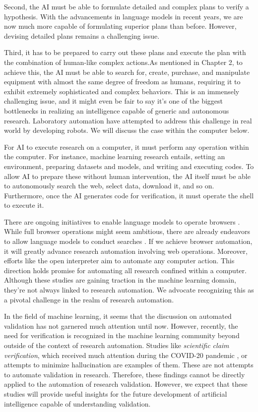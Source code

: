 Second, the AI must be able to formulate detailed and complex plans to verify a hypothesis. With the advancements in language models in recent years, we are now much more capable of formulating superior plans than before. However, devising detailed plans remains a challenging issue.

Third, it has to be prepared to carry out these plans and execute the plan with the combination of human-like complex actions.As mentioned in Chapter 2, to achieve this, the AI must be able to search for, create, purchase, and manipulate equipment with almost the same degree of freedom as humans, requiring it to exhibit extremely sophisticated and complex behaviors. This is an immensely challenging issue, and it might even be fair to say it's one of the biggest bottlenecks in realizing an intelligence capable of generic and autonomous research. Laboratory automation have attempted to address this challenge in real world by developing robots. We will discuss the case within the computer below.

For AI to execute research on a computer, it must perform any operation within the computer. For instance, machine learning research entails, setting an environment, preparing datasets and models, and writing and executing codes. To allow AI to prepare these without human intervention, the AI itself must be able to autonomously search the web, select data, download it, and so on. Furthermore, once the AI generates code for verification, it must operate the shell to execute it.

There are ongoing initiatives to enable language models to operate browsers \cite{nakano2021webgpt,act1}. While full browser operations might seem ambitious, there are already endeavors to allow language models to conduct searches \cite{mialon2023augmented}. If we achieve browser automation, it will greatly advance research automation involving web operations. Moreover, efforts like the open interpreter \cite{openinterpreter} aim to automate any computer action. This direction holds promise for automating all research confined within a computer. Although these studies are gaining traction in the machine learning domain, they're not always linked to research automation. We advocate recognizing this as a pivotal challenge in the realm of research automation.

In the field of machine learning, it seems that the discussion on automated validation has not garnered much attention until now. However, recently, the need for verification is recognized in the machine learning community beyond outside of the context of research automation. Studies like \textit{scientific claim verification}, which received much attention during the COVID-20 pandemic \cite{wadden2020fact}, or attempts to minimize hallucination \cite{dhuliawala2023chain} are examples of them. These are not attempts to automate validation in research. Therefore, these findings cannot be directly applied to the automation of research validation. However, we expect that these studies will provide useful insights for the future development of artificial intelligence capable of understanding validation.

